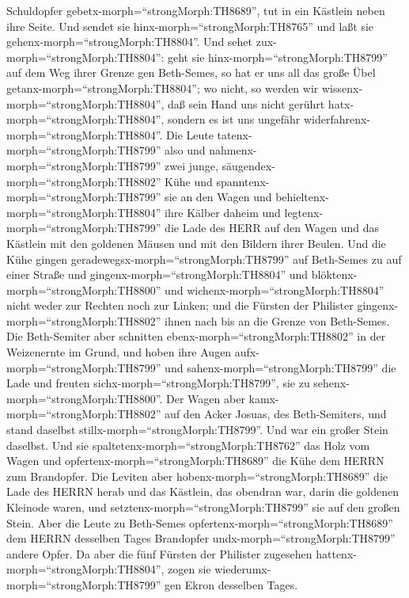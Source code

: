 Schuldopfer gebetx-morph=``strongMorph:TH8689'', tut in ein Kästlein
neben ihre Seite. Und sendet sie hinx-morph=``strongMorph:TH8765'' und
laßt sie gehenx-morph=``strongMorph:TH8804''.  Und sehet
zux-morph=``strongMorph:TH8804'': geht sie
hinx-morph=``strongMorph:TH8799'' auf dem Weg ihrer Grenze gen
Beth-Semes, so hat er uns all das große Übel
getanx-morph=``strongMorph:TH8804''; wo nicht, so werden wir
wissenx-morph=``strongMorph:TH8804'', daß sein Hand uns nicht gerührt
hatx-morph=``strongMorph:TH8804'', sondern es ist uns ungefähr
widerfahrenx-morph=``strongMorph:TH8804''.  Die Leute
tatenx-morph=``strongMorph:TH8799'' also und
nahmenx-morph=``strongMorph:TH8799'' zwei junge,
säugendex-morph=``strongMorph:TH8802'' Kühe und
spanntenx-morph=``strongMorph:TH8799'' sie an den Wagen und
behieltenx-morph=``strongMorph:TH8804'' ihre Kälber daheim 
und legtenx-morph=``strongMorph:TH8799'' die Lade des HERR auf den Wagen
und das Kästlein mit den goldenen Mäusen und mit den Bildern ihrer
Beulen.  Und die Kühe gingen
geradewegsx-morph=``strongMorph:TH8799'' auf Beth-Semes zu auf einer
Straße und gingenx-morph=``strongMorph:TH8804'' und
blöktenx-morph=``strongMorph:TH8800'' und
wichenx-morph=``strongMorph:TH8804'' nicht weder zur Rechten noch zur
Linken; und die Fürsten der Philister
gingenx-morph=``strongMorph:TH8802'' ihnen nach bis an die Grenze von
Beth-Semes.  Die Beth-Semiter aber schnitten
ebenx-morph=``strongMorph:TH8802'' in der Weizenernte im Grund, und
hoben ihre Augen aufx-morph=``strongMorph:TH8799'' und
sahenx-morph=``strongMorph:TH8799'' die Lade und freuten
sichx-morph=``strongMorph:TH8799'', sie zu
sehenx-morph=``strongMorph:TH8800''.  Der Wagen aber
kamx-morph=``strongMorph:TH8802'' auf den Acker Josuas, des
Beth-Semiters, und stand daselbst stillx-morph=``strongMorph:TH8799''.
Und war ein großer Stein daselbst. Und sie
spaltetenx-morph=``strongMorph:TH8762'' das Holz vom Wagen und
opfertenx-morph=``strongMorph:TH8689'' die Kühe dem HERRN zum
Brandopfer.  Die Leviten aber
hobenx-morph=``strongMorph:TH8689'' die Lade des HERRN herab und das
Kästlein, das obendran war, darin die goldenen Kleinode waren, und
setztenx-morph=``strongMorph:TH8799'' sie auf den großen Stein. Aber die
Leute zu Beth-Semes opfertenx-morph=``strongMorph:TH8689'' dem HERRN
desselben Tages Brandopfer undx-morph=``strongMorph:TH8799'' andere
Opfer.  Da aber die fünf Fürsten der Philister zugesehen
hattenx-morph=``strongMorph:TH8804'', zogen sie
wiederumx-morph=``strongMorph:TH8799'' gen Ekron desselben Tages.
